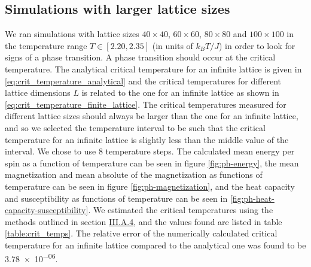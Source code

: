 \documentclass[reprint,english,notitlepage]{revtex4-1}  %
\begin{document}
\subsection{Simulations with larger lattice sizes} \label{sec:IV:D}

\newcommand{\tempsteps}{8}
\newcommand{\tempmin}{2.20}
\newcommand{\tempmax}{2.35}

We ran simulations with lattice sizes $40\times 40$, $60 \times 60$, $80 \times 80$ and $100 \times 100$ in the temperature range $T\in[\tempmin ,\tempmax ]$ (in units of $k_B T/J$) in order to look for signs of a phase transition. A phase transition should occur at the critical temperature. The analytical critical temperature for an infinite lattice is given in \eqref{eq:crit_temperature_analytical} and the critical temperatures for different lattice dimensions $L$ is related to the one for an infinite lattice as shown in \eqref{eq:crit_temperature_finite_lattice}. The critical temperatures measured for different lattice sizes should always be larger than the one for an infinite lattice, and so we selected the temperature interval to be such that the critical temperature for an infinite lattice is slightly less than the middle value of the interval. We chose to use $\tempsteps$ temperature steps. The calculated mean energy per spin as a function of temperature can be seen in figure \ref{fig:ph-energy}, the mean magnetization and mean absolute of the magnetization as functions of temperature can be seen in figure \ref{fig:ph-magnetization}, and the heat capacity and susceptibility as functions of temperature can be seen in \ref{fig:ph-heat-capacity-susceptibility}. We estimated the critical temperatures using the methods outlined in section \hyperref[sec:III:A.iv]{III.A.4}, and the values found are listed in table \ref{table:crit_temps}. The relative error of the numerically calculated critical temperature for an infinite lattice compared to the analytical one was found to be \num{3.78e-06}.
\end{document}
